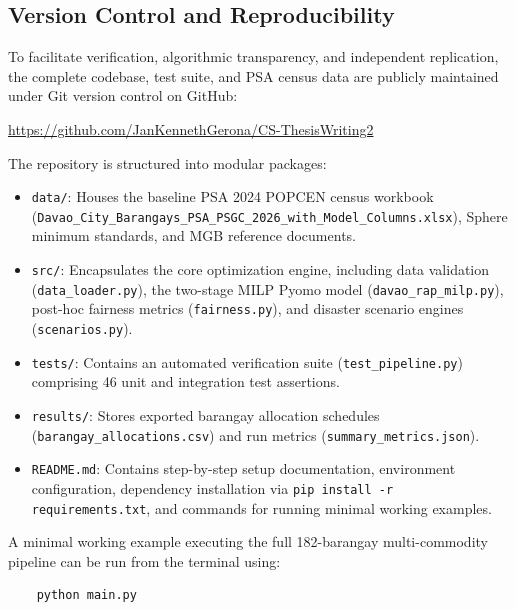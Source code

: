 \subsection{Version Control and Reproducibility}
\label{sec:reproducibility}
To facilitate verification, algorithmic transparency, and independent replication, the complete codebase, test suite, and PSA census data are publicly maintained under Git version control on GitHub:
\begin{center}
    \url{https://github.com/JanKennethGerona/CS-ThesisWriting2}
\end{center}

The repository is structured into modular packages:
\begin{itemize}
    \item \texttt{data/}: Houses the baseline PSA 2024 POPCEN census workbook (\texttt{Davao\_City\_Barangays\_PSA\_PSGC\_2026\_with\_Model\_Columns.xlsx}), Sphere minimum standards, and MGB reference documents.
    \item \texttt{src/}: Encapsulates the core optimization engine, including data validation (\texttt{data\_loader.py}), the two-stage MILP Pyomo model (\texttt{davao\_rap\_milp.py}), post-hoc fairness metrics (\texttt{fairness.py}), and disaster scenario engines (\texttt{scenarios.py}).
    \item \texttt{tests/}: Contains an automated verification suite (\texttt{test\_pipeline.py}) comprising 46 unit and integration test assertions.
    \item \texttt{results/}: Stores exported barangay allocation schedules (\texttt{barangay\_allocations.csv}) and run metrics (\texttt{summary\_metrics.json}).
    \item \texttt{README.md}: Contains step-by-step setup documentation, environment configuration, dependency installation via \texttt{pip install -r requirements.txt}, and commands for running minimal working examples.
\end{itemize}

A minimal working example executing the full 182-barangay multi-commodity pipeline can be run from the terminal using:
\begin{verbatim}
    python main.py
\end{verbatim}


